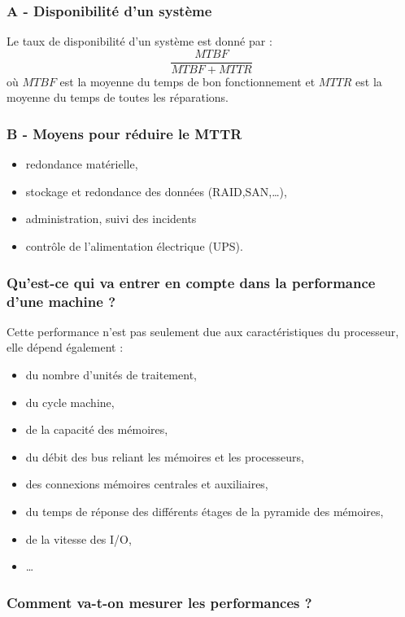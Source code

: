 \documentclass[10pt,a4paper,oneside,titlepage]{report}
\begin{document}
\subsubsection{A - Disponibilité d'un système}

Le taux de disponibilité d'un système est donné par : $$\frac{MTBF}{MTBF+MTTR}$$
où $MTBF$ est la moyenne du temps de bon fonctionnement et $MTTR$ est la moyenne
du temps de toutes les réparations.

\subsubsection{B - Moyens pour réduire le MTTR}

\begin{itemize}
\item redondance matérielle,
\item stockage et redondance des données (RAID,SAN,\dots),
\item administration, suivi des incidents
\item contr\^ole de l'alimentation électrique (UPS).
\end{itemize}

\subsubsection{Qu'est-ce qui va entrer en compte dans la performance d'une
machine ?}

Cette performance n'est pas seulement due aux caractéristiques du processeur,
elle dépend également :
\begin{itemize}
\item du nombre d'unités de traitement,
\item du cycle machine,
\item de la capacité des mémoires,
\item du débit des bus reliant les mémoires et les processeurs,
\item des connexions mémoires centrales et auxiliaires,
\item du temps de réponse des différents étages de la pyramide des mémoires,
\item de la vitesse des I/O,
\item \dots
\end{itemize}

\subsubsection{Comment va-t-on mesurer les performances ?}
\end{document}
